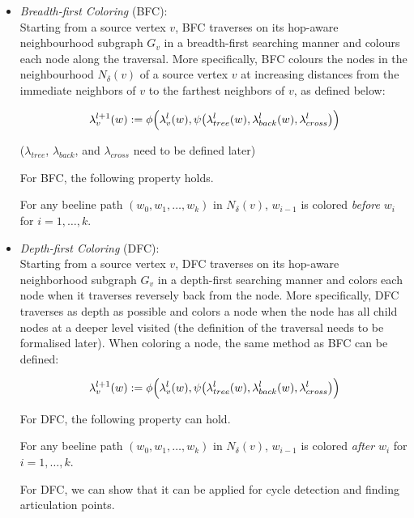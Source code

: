 \begin{itemize}
\item \emph{Breadth-first Coloring} (BFC): \\ Starting from a source vertex $v$, BFC traverses on its hop-aware neighbourhood subgraph $G_v$ in a breadth-first searching manner and colours each node along the traversal. More specifically,  BFC colours the nodes in the neighbourhood $N_{\delta}(v)$ of a source vertex $v$ at increasing distances from the immediate neighbors of $v$ to the farthest neighbors of $v$, as defined below:

\begin{equation}
\label{eqn:bfs_lvc_forward}
    \lambda^{l+1}_v(w):= \phi\Bigl(\lambda^{l}_v(w), \psi\bigl(\lambda^{l}_{tree}(w), \lambda_{back}^{l}(w), \lambda_{cross}^{l}\bigr)\Bigr)
\end{equation}

($\lambda_{tree}$, $\lambda_{back}$, and $\lambda_{cross}$ need to be defined later)

For BFC, the following property holds.
\begin{lemma}
 For any beeline path $(w_0,w_1,\dots,w_k)$ in $N_{\delta}(v)$, $w_{i-1}$ is colored \emph{before} $w_i$ for $i=1,\dots, k$.   
\end{lemma}



\item  \emph{Depth-first Coloring} (DFC): \\
Starting from a source vertex $v$, DFC traverses on its hop-aware neighborhood subgraph $G_v$ in a depth-first searching manner and colors each node when it traverses reversely back from the node. More specifically, DFC traverses as depth as possible and colors a node when the node has all child nodes at a deeper level visited (the definition of the traversal needs to be formalised later). When coloring a node, the same method as BFC can be defined:

\begin{equation}
\label{eqn:bfs_lvc_forward}
    \lambda^{l+1}_v(w):= \phi\Bigl(\lambda^{l}_v(w), \psi\bigl(\lambda^{l}_{tree}(w), \lambda_{back}^{l}(w), \lambda_{cross}^{l}\bigr)\Bigr)
\end{equation}

For DFC, the following property can hold.
\begin{lemma}
For any beeline path $(w_0,w_1,\dots,w_k)$ in $N_{\delta}(v)$, $w_{i-1}$ is colored \emph{after} $w_i$ for $i=1,\dots, k$.
\end{lemma}

For DFC, we can show that it can be applied for cycle detection and finding articulation points.

\end{itemize}
